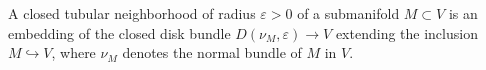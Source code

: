A closed tubular neighborhood of radius $\varepsilon > 0$ of a submanifold $M \subset V$ is an embedding of the closed disk bundle $D(\nu_M, \varepsilon) \to V$ extending the inclusion $M \hookrightarrow V$, where $\nu_M$ denotes the normal bundle of $M$ in $V$.
